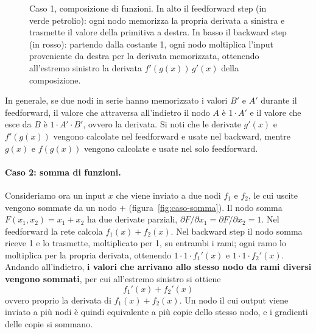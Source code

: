 \begin{figure}[htbp]
\centering
{}
\caption{Caso 1, composizione di funzioni. In alto il feedforward step (in verde petrolio): ogni nodo memorizza la propria derivata a sinistra e trasmette il valore della primitiva a destra. In basso il backward step (in rosso): partendo dalla costante 1, ogni nodo moltiplica l'input proveniente da destra per la derivata memorizzata, ottenendo all'estremo sinistro la derivata $f'(g(x))\,g'(x)$ della composizione.}
\label{fig:caso-composizione}
\end{figure}

In generale, se due nodi in serie hanno memorizzato i valori $B'$ e $A'$ durante il feedforward, il valore che attraversa all'indietro il nodo $A$ è $1\cdot A'$ e il valore che esce da $B$ è $1\cdot A' \cdot B'$, ovvero la derivata. Si noti che le derivate $g'(x)$ e $f'(g(x))$ vengono calcolate nel feedforward e usate nel backward, mentre $g(x)$ e $f(g(x))$ vengono calcolate e usate nel solo feedforward.

\paragraph{Caso 2: somma di funzioni.}
Consideriamo ora un input $x$ che viene inviato a due nodi $f_1$ e $f_2$, le cui uscite vengono sommate da un nodo $+$ (figura~\ref{fig:caso-somma}). Il nodo somma $F(x_1, x_2) = x_1 + x_2$ ha due derivate parziali, $\partial F/\partial x_1 = \partial F/\partial x_2 = 1$. Nel feedforward la rete calcola $f_1(x) + f_2(x)$. Nel backward step il nodo somma riceve 1 e lo trasmette, moltiplicato per 1, su entrambi i rami; ogni ramo lo moltiplica per la propria derivata, ottenendo $1\cdot 1\cdot f_1'(x)$ e $1\cdot 1\cdot f_2'(x)$. Andando all'indietro, \textbf{i valori che arrivano allo stesso nodo da rami diversi vengono sommati}, per cui all'estremo sinistro si ottiene
\[
f_1'(x) + f_2'(x)
\]
ovvero proprio la derivata di $f_1(x) + f_2(x)$. Un nodo il cui output viene inviato a più nodi è quindi equivalente a più copie dello stesso nodo, e i gradienti delle copie si sommano.

